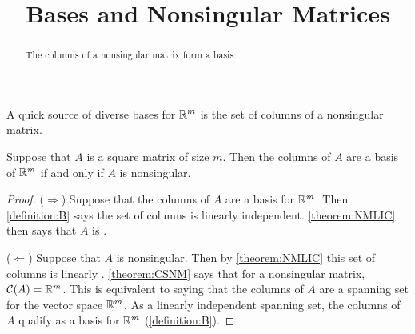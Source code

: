 \documentclass{ximera}
\title{Bases and Nonsingular Matrices}
\begin{document}
\begin{abstract}
  The columns of a nonsingular matrix form a basis.
\end{abstract}
\maketitle

A quick source of diverse bases for $\mathbb{R}^{m}$ is the set of columns of a nonsingular matrix.

\begin{theorem}
  \label{theorem:CNMB}

  Suppose that $A$ is a square matrix of size $m$.  Then the columns
  of $A$ are a basis of $\mathbb{R}^{m}$ if and only if $A$ is nonsingular.
  
  \begin{proof}
    ($\Rightarrow$) Suppose that the columns of $A$ are a basis for
    $\mathbb{R}^{m}$.  Then \ref{definition:B} says the set of columns is
    linearly independent.  \ref{theorem:NMLIC} then says that $A$ is
    .
    
    ($\Leftarrow$) Suppose that $A$ is nonsingular.  Then by
    \ref{theorem:NMLIC} this set of columns is linearly
    .
    \ref{theorem:CSNM} says that for a nonsingular matrix,
    $\mathcal{C}\!\left(A\right)=\mathbb{R}^{m}$.  This is equivalent to saying that the columns
    of $A$ are a spanning set for the vector space $\mathbb{R}^{m}$.  As a
    linearly independent spanning set, the columns of $A$ qualify as a
    basis for $\mathbb{R}^{m}$ (\ref{definition:B}).
  \end{proof}
\end{theorem}
\end{document}
